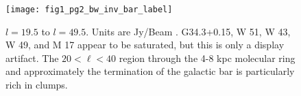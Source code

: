 \documentclass[12pt,preprint]{aastex}
\begin{document}
\addtocounter{figure}{-1}
\addtocounter{subfig}{1}

\begin{figure}
  \begin{minipage}{6.5in} 
    \begin{center}
      \texttt{[image: fig1\_pg2\_bw\_inv\_bar\_label]} 
      \caption{$l=19.5$ to $l=49.5$.  Units are Jy/Beam .  G34.3+0.15, W
	51, W 43, W 49, and M 17 appear to be saturated, but this is
	only a display artifact.  The $20 < \ell < 40$ region through the
        4-8 kpc molecular ring and approximately the termination of the galactic
        bar is particularly rich in clumps.}
    \end{center}
  \end{minipage}
\end{figure}

\addtocounter{figure}{-1}
\addtocounter{subfig}{1}
\end{document}
